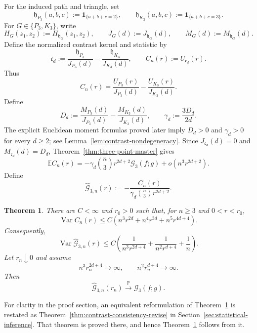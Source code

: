 \documentclass[11pt]{article}
\newtheorem{theorem}{Theorem}[section]
\theoremstyle{remark}
\newcommand{\ind}{\mathbf 1}
\newcommand{\E}{\mathbb E}
\newcommand{\Pp}{\mathbb P}
\numberwithin{equation}{section}
\begin{document}
For the induced path and triangle, set
\[
\mathfrak h_{P_3}(a,b,c):=\ind_{\{a+b+c=2\}},
\qquad
\mathfrak h_{K_3}(a,b,c):=\ind_{\{a+b+c=3\}}.
\]
For $G\in\{P_3,K_3\}$, write
\[
H_G(z_1,z_2):=H_{\mathfrak h_G}(z_1,z_2),
\qquad
J_G(d):=J_{\mathfrak h_G}(d),
\qquad
M_G(d):=M_{\mathfrak h_G}(d).
\]
Define the normalized contrast kernel and statistic by
\[
\mathfrak c_d
:=\frac{\mathfrak h_{P_3}}{J_{P_3}(d)}
 -\frac{\mathfrak h_{K_3}}{J_{K_3}(d)},
\qquad
C_n(r):=U_{\mathfrak c_d}(r).
\]
Thus
\[
C_n(r)
=\frac{U_{P_3}(r)}{J_{P_3}(d)}
 -\frac{U_{K_3}(r)}{J_{K_3}(d)}.
\]
Define
\[
D_d
:=\frac{M_{P_3}(d)}{J_{P_3}(d)}
 -\frac{M_{K_3}(d)}{J_{K_3}(d)},
\qquad
\gamma_d:=\frac{3D_d}{2d}.
\]
The explicit Euclidean moment formulas proved later imply
$D_d>0$ and $\gamma_d>0$
for every $d\ge2$; see Lemma~\ref{lem:contrast-nondegeneracy}.
Since $J_{\mathfrak c_d}(d)=0$ and
$M_{\mathfrak c_d}(d)=D_d$, Theorem~\ref{thm:three-point-master}
gives
\begin{equation}
\E C_n(r)
=-\gamma_d\binom n3 r^{2d+2}\mathcal G_3(f;g)
+o\!\left(n^3r^{2d+2}\right).
\label{eq:contrast-mean}
\end{equation}
Define
\begin{equation}
\widehat{\mathcal G}_{3,n}(r)
:=-\frac{C_n(r)}
{\gamma_d\binom n3 r^{2d+2}}.
\label{eq:G3-estimator}
\end{equation}

\begin{theorem}
\label{thm:contrast-consistency}
There are $C<\infty$ and $r_0>0$ such that, for
$n\ge3$ and $0<r<r_0$,
\begin{equation}
\operatorname{Var} C_n(r)
\le C\left(
n^3r^{2d}
+n^4r^{3d}
+n^5r^{4d+4}
\right).
\label{eq:contrast-variance-bound}
\end{equation}
Consequently,
\begin{equation}
\operatorname{Var}\widehat{\mathcal G}_{3,n}(r)
\le C\left(
\frac1{n^3r^{2d+4}}
+\frac1{n^2r^{d+4}}
+\frac1n
\right).
\label{eq:G3-estimator-variance-bound}
\end{equation}
Let $r_n\downarrow0$ and assume
\begin{equation}
n^3r_n^{2d+4}\rightarrow\infty,
\qquad
n^2r_n^{d+4}\rightarrow\infty.
\label{eq:contrast-consistency-bandwidth}
\end{equation}
Then
\[
\widehat{\mathcal G}_{3,n}(r_n)
\xrightarrow{\Pp}\mathcal G_3(f;g).
\]
\end{theorem}

For clarity in the proof section, an equivalent reformulation of
Theorem~\ref{thm:contrast-consistency} is restated as
Theorem~\ref{thm:contrast-consistency-revise} in
Section~\ref{sec:statistical-inference}.  That theorem is proved there,
and hence Theorem~\ref{thm:contrast-consistency} follows from it.
\end{document}
